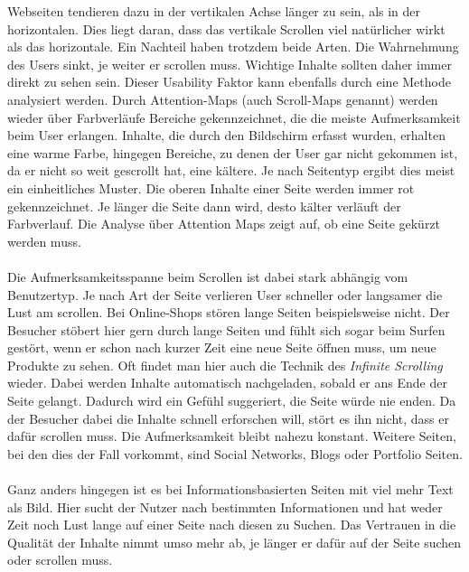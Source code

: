 Webseiten tendieren dazu in der vertikalen Achse länger zu sein, als in der horizontalen. Dies liegt daran, dass das vertikale Scrollen viel natürlicher wirkt als das horizontale. Ein Nachteil haben trotzdem beide Arten. Die Wahrnehmung des Users sinkt, je weiter er scrollen muss. Wichtige Inhalte sollten daher immer direkt zu sehen sein. Dieser Usability Faktor kann ebenfalls durch eine Methode analysiert werden. Durch Attention-Maps (auch Scroll-Maps genannt) werden wieder über Farbverläufe Bereiche gekennzeichnet, die die meiste Aufmerksamkeit beim User erlangen. Inhalte, die durch den Bildschirm erfasst wurden, erhalten eine warme Farbe, hingegen Bereiche, zu denen der User gar nicht gekommen ist, da er nicht so weit gescrollt hat, eine kältere. Je nach Seitentyp ergibt dies meist ein einheitliches Muster. Die oberen Inhalte einer Seite werden immer rot gekennzeichnet. Je länger die Seite dann wird, desto kälter verläuft der Farbverlauf. Die Analyse über Attention Maps zeigt auf, ob eine Seite gekürzt werden muss.\\
\\
Die Aufmerksamkeitsspanne beim Scrollen ist dabei stark abhängig vom Benutzertyp. Je nach Art der Seite verlieren User schneller oder langsamer die Lust am scrollen. Bei Online-Shops stören lange Seiten beispielsweise nicht. Der Besucher stöbert hier gern durch lange Seiten und fühlt sich sogar beim Surfen gestört, wenn er schon nach kurzer Zeit eine neue Seite öffnen muss, um neue Produkte zu sehen. Oft findet man hier auch die Technik des \textit{Infinite Scrolling} wieder. Dabei werden Inhalte automatisch nachgeladen, sobald er ans Ende der Seite gelangt. Dadurch wird ein Gefühl suggeriert, die Seite würde nie enden. Da der Besucher dabei die Inhalte schnell erforschen will, stört es ihn nicht, dass er dafür scrollen muss. Die Aufmerksamkeit bleibt nahezu konstant. Weitere Seiten, bei den dies der Fall vorkommt, sind Social Networks, Blogs oder Portfolio Seiten.\\
\\
Ganz anders hingegen ist es bei Informationsbasierten Seiten mit viel mehr Text als Bild. Hier sucht der Nutzer nach bestimmten Informationen und hat weder Zeit noch Lust lange auf einer Seite nach diesen zu Suchen. Das Vertrauen in die Qualität der Inhalte nimmt umso mehr ab, je länger er dafür auf der Seite suchen oder scrollen muss.